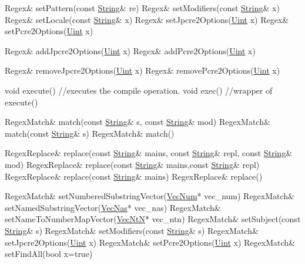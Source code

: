 \begin{DoxyCode}
Regex&              setPattern(const \hyperlink{namespacejpcre2_a91f03070152fb228bc116c5a737f1d16}{String}& re)
Regex&              setModifiers(const \hyperlink{namespacejpcre2_a91f03070152fb228bc116c5a737f1d16}{String}& x)
Regex&              setLocale(const \hyperlink{namespacejpcre2_a91f03070152fb228bc116c5a737f1d16}{String}& x)
Regex&              setJpcre2Options(\hyperlink{namespacejpcre2_a078242d38221a13fb3543b9edd78c099}{Uint} x)
Regex&              setPcre2Options(\hyperlink{namespacejpcre2_a078242d38221a13fb3543b9edd78c099}{Uint} x)

Regex&              addJpcre2Options(\hyperlink{namespacejpcre2_a078242d38221a13fb3543b9edd78c099}{Uint} x)
Regex&              addPcre2Options(\hyperlink{namespacejpcre2_a078242d38221a13fb3543b9edd78c099}{Uint} x)

Regex&              removeJpcre2Options(\hyperlink{namespacejpcre2_a078242d38221a13fb3543b9edd78c099}{Uint} x)
Regex&              removePcre2Options(\hyperlink{namespacejpcre2_a078242d38221a13fb3543b9edd78c099}{Uint} x)

\textcolor{keywordtype}{void}                execute()  \textcolor{comment}{//executes the compile operation.}
\textcolor{keywordtype}{void}                exec()     \textcolor{comment}{//wrapper of execute()}

RegexMatch&         match(const \hyperlink{namespacejpcre2_a91f03070152fb228bc116c5a737f1d16}{String}& s, const \hyperlink{namespacejpcre2_a91f03070152fb228bc116c5a737f1d16}{String}& mod)
RegexMatch&         match(const \hyperlink{namespacejpcre2_a91f03070152fb228bc116c5a737f1d16}{String}& s)
RegexMatch&         match()

RegexReplace&       replace(const \hyperlink{namespacejpcre2_a91f03070152fb228bc116c5a737f1d16}{String}& mains, const \hyperlink{namespacejpcre2_a91f03070152fb228bc116c5a737f1d16}{String}& repl, const 
      \hyperlink{namespacejpcre2_a91f03070152fb228bc116c5a737f1d16}{String}& mod)
RegexReplace&       replace(const \hyperlink{namespacejpcre2_a91f03070152fb228bc116c5a737f1d16}{String}& mains,const \hyperlink{namespacejpcre2_a91f03070152fb228bc116c5a737f1d16}{String}& repl)
RegexReplace&       replace(const \hyperlink{namespacejpcre2_a91f03070152fb228bc116c5a737f1d16}{String}& mains)
RegexReplace&       replace()



RegexMatch&         setNumberedSubstringVector(\hyperlink{namespacejpcre2_ac1cf752c8fbb0be78020be3b80e77ce3}{VecNum}* vec\_num)
RegexMatch&         setNamedSubstringVector(\hyperlink{namespacejpcre2_a2b121ae776ea5b2913839f418a7d856b}{VecNas}* vec\_nas)
RegexMatch&         setNameToNumberMapVector(\hyperlink{namespacejpcre2_a88a7aaf84cad627d34c8152e726168eb}{VecNtN}* vec\_ntn)
RegexMatch&         setSubject(const \hyperlink{namespacejpcre2_a91f03070152fb228bc116c5a737f1d16}{String}& s)
RegexMatch&         setModifiers(const \hyperlink{namespacejpcre2_a91f03070152fb228bc116c5a737f1d16}{String}& s)
RegexMatch&         setJpcre2Options(\hyperlink{namespacejpcre2_a078242d38221a13fb3543b9edd78c099}{Uint} x)
RegexMatch&         setPcre2Options(\hyperlink{namespacejpcre2_a078242d38221a13fb3543b9edd78c099}{Uint} x)
RegexMatch&         setFindAll(\textcolor{keywordtype}{bool} x=true)


\end{DoxyCode}
